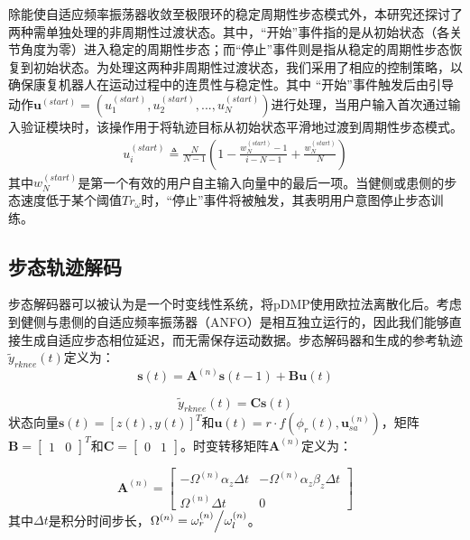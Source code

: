 除能使自适应频率振荡器收敛至极限环的稳定周期性步态模式外，本研究还探讨了两种需单独处理的非周期性过渡状态。其中，“开始”事件指的是从初始状态（各关节角度为零）进入稳定的周期性步态；而“停止”事件则是指从稳定的周期性步态恢复到初始状态。为处理这两种非周期性过渡状态，我们采用了相应的控制策略，以确保康复机器人在运动过程中的连贯性与稳定性。其中 ``开始''事件触发后由引导动作${\pmb{u}^{(start)}} = ({u}_1^{(start)},{u}_2^{(start)},...,{u}_N^{(start)})$进行处理，当用户输入首次通过输入验证模块时，该操作用于将轨迹目标从初始状态平滑地过渡到周期性步态模式。
\begin{equation}
  \label{deqn_ex18}
  \begin{array}{*{20}{c}}
    {{u}_i^{(start)} \triangleq \frac{N}{{N - 1}}\left( {1 - \frac{{w_N^{(start)} - 1}}{{i - N-1}} + \frac{{w_N^{(start)}}}{N}} \right)} 
  \end{array}
\end{equation} 
其中$w_N^{(start)}$是第一个有效的用户自主输入向量中的最后一项。当健侧或患侧的步态速度低于某个阈值$T{r_\omega }$时，“停止”事件将被触发，其表明用户意图停止步态训练。  

\subsection{步态轨迹解码}步态解码器可以被认为是一个时变线性系统，将pDMP使用欧拉法离散化后。考虑到健侧与患侧的自适应频率振荡器（ANFO）是相互独立运行的，因此我们能够直接生成自适应步态相位延迟，而无需保存运动数据。步态解码器和生成的参考轨迹${{\tilde y}_{rknee}}(t)$定义为：
\begin{equation}
  \label{deqn_ex19}
  \pmb{s}(t) = {{\boldsymbol{A}}^{(n)}}\pmb{s}(t - 1) + {\boldsymbol{B}}\pmb{u}(t)
\end{equation}

\begin{equation}
  \label{deqn_ex20}
  {{\tilde y}_{rknee}}(t) = {\boldsymbol{C}}\pmb{s}(t)
\end{equation}    
状态向量$\pmb{s}(t)={\left[ {z(t),y(t)} \right]^T}$和${\pmb{u}}(t)=r \cdot f({\phi _r}(t),{\pmb{u}}_{sa}^{(n)})$，矩阵${\boldsymbol{B}={\left[ {\begin{array}{*{20}{c}}1&0 \end{array}} \right]^T}}$和${\boldsymbol{C}=\left[{\begin{array}{*{20}{c}}0&1 \end{array}} \right]}$。时变转移矩阵${{\boldsymbol{A}}^{(n)}}$定义为：

\[{{\boldsymbol{A}}^{(n)}} = \left[ {\begin{array}{*{20}{c}}
{ - {\Omega ^{(n)}}{\alpha _z}\Delta t}&{ - {\Omega ^{(n)}}{\alpha _z}{\beta _z}\Delta t}  \\  
{{\Omega ^{(n)}}\Delta t}&0 
\end{array}} \right]\]    
其中$\Delta t$是积分时间步长，${\Omega ^{(n)}} = {{\omega _r^{(n)}} \mathord{\left/{\vphantom {{\omega _r^{(n)}} {\omega _l^{(n)}}}} \right.\kern-\nulldelimiterspace} {\omega _l^{(n)}}}$。

